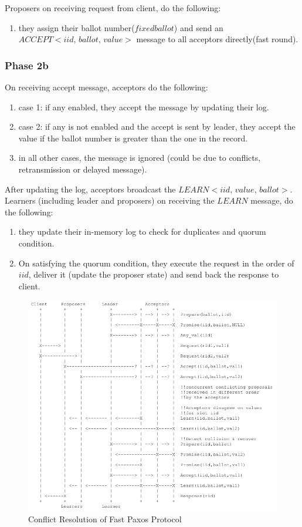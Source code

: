 \noindent
Proposers on receiving request from client, do the following:
\begin{enumerate}
\item they assign their ballot number($fixed ballot$) and send an $ACCEPT<iid, \, ballot, \, value>$ message to all acceptors directly(fast round).
\end{enumerate}

\subsubsection{Phase 2b}
\noindent
On receiving accept message, acceptors do the following:
\begin{enumerate}
\item case 1: if any enabled, they accept the message by updating their log.
\item case 2: if any is not enabled and the accept is sent by leader, they accept the value if the ballot number is greater than the one in the record.
\item in all other cases, the message is ignored (could be due to conflicts, retransmission or delayed message).
\end{enumerate}

After updating the log, acceptors broadcast the $LEARN<iid, \, value, \, ballot>$. \\
\noindent
Learners (including leader and proposers) on receiving the $LEARN$ message, do the following:
\begin{enumerate}
\item they update their in-memory log to check for duplicates and quorum condition.
\item On satisfying the quorum condition, they execute the request in the order of $iid$, deliver it (update the proposer state) and send back the response to client.
\end{enumerate}

\begin{figure}[ht!]
\centering
\includegraphics[width=160mm]{FP_with-conflict.png}
\caption{Conflict Resolution of Fast Paxos Protocol}
\label{conflictpax}
\end{figure}


